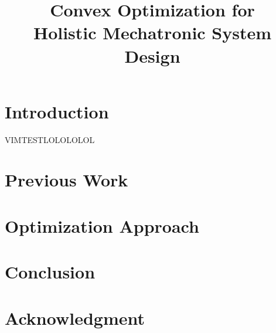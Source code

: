\documentclass[conference]{IEEEtran}
\begin{document}
\title{Convex Optimization for \\Holistic Mechatronic System Design}



\maketitle %

\begin{abstract}

\end{abstract}

\section{Introduction}

VIMTESTLOLOLOLOL \cite{Mechatronics}

\section{Previous Work}


\section{Optimization Approach}


\section{Conclusion}


\section*{Acknowledgment}







\end{document}
